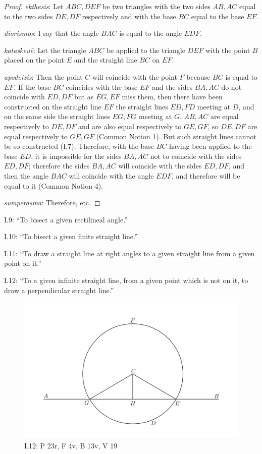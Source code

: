 \documentclass{article}
\begin{document}
\begin{proof}
{\em ekthesis}: Let $ABC,DEF$ be two triangles with the two sides $AB,AC$ equal to the two sides $DE,DF$ respectively
and with the base $BC$ equal to the base $EF$. 

{\em diorismos}: I say that the angle $BAC$ is equal to the angle $EDF$.

{\em kataskeu\={e}}: Let the triangle $ABC$ be applied to the triangle $DEF$ with the point $B$ placed on the point $E$
and the straight line $BC$ on $EF$.

{\em apodeixis}: Then the point $C$ will coincide with the point $F$ because
$BC$ is equal to $EF$.
If the base $BC$ coincides with the base $EF$ and the sides $BA,AC$ do not coincide with $ED,DF$ but
 as $EG,EF$ miss them, then there have been constructed on the straight line
$EF$ the straight lines $ED,FD$ meeting at $D$, and on the same side
the straight lines $EG,FG$
meeting at $G$. $AB,AC$ are equal respectively to $DE,DF$ and are also
equal respectively to $GE,GF$, so 
$DE,DF$ are equal respectively to $GE,GF$ (Common Notion 1). But such straight lines cannot be so constructed (I.7). 
Therefore, with the base $BC$ having been applied to the base $ED$, it is impossible for the sides $BA,AC$ not to coincide with the sides
$ED,DF$; therefore the sides $BA,AC$ will coincide with the sides $ED,DF$, and then
the angle $BAC$ will coincide with the angle $EDF$, and therefore will be equal to it (Common Notion 4).

{\em sumperasma}: Therefore, etc.
\end{proof}

I.9: ``To bisect a given rectilineal angle.''

I.10: ``To bisect a given finite straight line.''

I.11: ``To draw a straight line at right angles to a given straight
line from a given point on it.''

I.12: ``To a given infinite straight line, from a given point
which is not on it, to draw a perpendicular straight line.''


\begin{figure}
\begin{center}
\includegraphics[scale=1]{I12.png}
\end{center}
\caption{I.12: P 23r, F 4v, B 13v, V 19}
\label{I12}
\end{figure}
\end{document}
